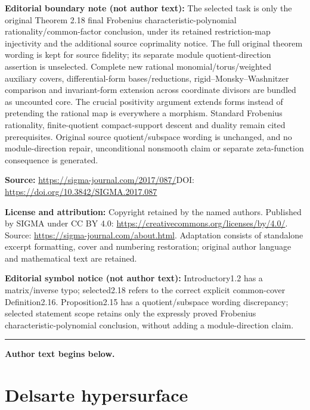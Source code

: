 \documentclass[11pt]{article}
\numberwithin{equation}{section}
\begin{document}
\noindent\textbf{Editorial boundary note (not author text):} The selected task is only the original Theorem 2.18 final Frobenius characteristic-polynomial rationality/common-factor conclusion, under its retained restriction-map injectivity and the additional source coprimality notice. The full original theorem wording is kept for source fidelity; its separate module quotient-direction assertion is unselected. Complete new rational monomial/torus/weighted auxiliary covers, differential-form bases/reductions, rigid–Monsky–Washnitzer comparison and invariant-form extension across coordinate divisors are bundled as uncounted core. The crucial positivity argument extends forms instead of pretending the rational map is everywhere a morphism. Standard Frobenius rationality, finite-quotient compact-support descent and duality remain cited prerequisites. Original source quotient/subspace wording is unchanged, and no module-direction repair, unconditional nonsmooth claim or separate zeta-function consequence is generated.\par
\noindent\textbf{Source:} \url{https://sigma-journal.com/2017/087/}\quad DOI: \url{https://doi.org/10.3842/SIGMA.2017.087}\par
\noindent\textbf{License and attribution:} Copyright retained by the named authors. Published by SIGMA under CC BY 4.0: \url{https://creativecommons.org/licenses/by/4.0/}. Source: \url{https://sigma-journal.com/about.html}. Adaptation consists of standalone excerpt formatting, cover and numbering restoration; original author language and mathematical text are retained.\par
\noindent\textbf{Editorial symbol notice (not author text):} Introductory1.2 has a matrix/inverse typo; selected2.18 refers to the correct explicit common-cover Definition2.16. Proposition2.15 has a quotient/subspace wording discrepancy; selected statement scope retains only the expressly proved Frobenius characteristic-polynomial conclusion, without adding a module-direction claim.\par
\medskip\hrule\medskip\noindent\textbf{Author text begins below.}\par
\setcounter{section}{1}
\setcounter{subsection}{0}
\setcounter{subsubsection}{0}
\setcounter{Theorem}{2}
\setcounter{equation}{0}
\section{Delsarte hypersurface}
\end{document}
